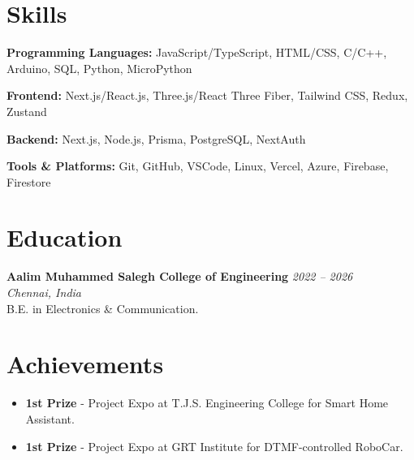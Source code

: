 \documentclass[a4paper,10pt]{article}
\newcommand{\institution}[1]{\textbf{#1}}
\newcommand{\daterange}[1]{\textit{#1}}
\newcommand{\location}[1]{\textit{#1}}
\begin{document}
\vspace{6pt}
\section*{Skills}

\textbf{Programming Languages:} JavaScript/TypeScript, HTML/CSS, C/C++, Arduino, SQL, Python, MicroPython

\vspace{2pt}
\textbf{Frontend:} Next.js/React.js, Three.js/React Three Fiber, Tailwind CSS, Redux, Zustand

\vspace{2pt}
\textbf{Backend:} Next.js, Node.js, Prisma, PostgreSQL, NextAuth

\vspace{2pt}
\textbf{Tools \& Platforms:} Git, GitHub, VSCode, Linux, Vercel, Azure, Firebase, Firestore

\vspace{6pt}
\section*{Education}
\institution{Aalim Muhammed Salegh College of Engineering} \hfill \daterange{2022 – 2026} \\
\location{Chennai, India} \\
B.E. in Electronics \& Communication.

\section*{Achievements}
\begin{itemize}
    \item \textbf{1st Prize} - Project Expo at T.J.S. Engineering College for Smart Home Assistant.
    \item \textbf{1st Prize} - Project Expo at GRT Institute for DTMF-controlled RoboCar.
\end{itemize}
\end{document}
